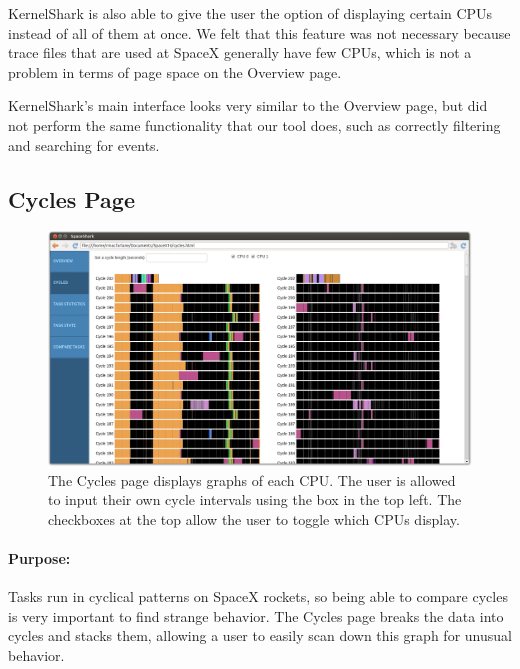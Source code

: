 \documentclass{hmcclinic}
\begin{document}
    KernelShark is also able to give the user the option of displaying certain
    CPUs instead of all of them at once. We felt that this feature was not
    necessary because trace files that are used at SpaceX generally have few CPUs, which is not a problem in terms of page space on the Overview page.
    
    KernelShark's main interface looks very similar to the Overview page, but did not perform the same functionality that our tool does, such as correctly filtering and searching for events.

    
  \subsection{Cycles Page} %

  \begin{figure}[H]
  \centering
      \includegraphics[width=5in]{cycles-page.png}
  \caption{The Cycles page displays graphs of each CPU. The user is allowed to
  input their own cycle intervals using the box in the top left. The checkboxes
at the top allow the user to toggle which CPUs display.}
  \end{figure}
  
  \paragraph{Purpose:}Tasks run in cyclical patterns on SpaceX rockets, so being able to compare
   cycles is very important to find strange behavior. The Cycles page
  breaks the data into cycles and stacks them, allowing a user to easily scan
  down this graph for unusual behavior.
\end{document}
